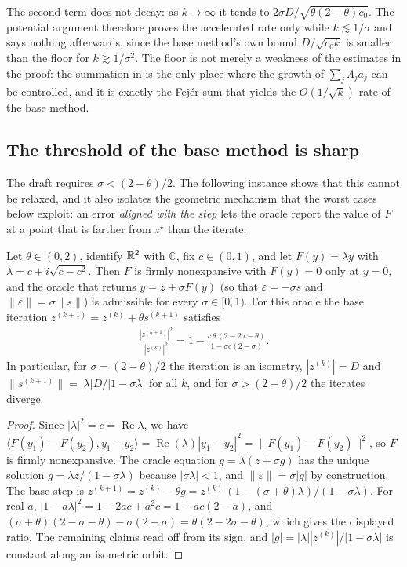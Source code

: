 The second term does not decay: as $k \to \infty$ it tends to $2\sigma D/\sqrt{\theta(2-\theta)c_0}$.
The potential argument therefore proves the accelerated rate only while $k \lesssim 1/\sigma$ and says nothing afterwards, since the base method's own bound $D/\sqrt{c_0 k}$ is smaller than the floor for $k \gtrsim 1/\sigma^2$.
The floor is not merely a weakness of the estimates in the proof: the summation in  is the only place where the growth of $\sum_j \Lambda_j a_j$ can be controlled, and it is exactly the Fej\'er sum that yields the $O(1/\sqrt{k})$ rate of the base method.

\subsection{The threshold of the base method is sharp}
The draft requires $\sigma < (2-\theta)/2$.
The following instance shows that this cannot be relaxed, and it also isolates the geometric mechanism that the worst cases below exploit: an error \emph{aligned with the step} lets the oracle report the value of $F$ at a point that is farther from $z^\star$ than the iterate.

\begin{proposition}\label{prop:acc-sharp}
    Let $\theta \in (0,2)$, identify $\mathbb{R}^2$ with $\mathbb{C}$, fix $c \in (0,1)$, and let $F(y) = \lambda y$ with $\lambda = c + i\sqrt{c - c^2}$.
    Then $F$ is firmly nonexpansive with $F(y) = 0$ only at $y = 0$, and the oracle that returns $y = z + \sigma F(y)$ (so that $\varepsilon = -\sigma s$ and $\|\varepsilon\| = \sigma\|s\|$) is admissible for every $\sigma \in [0,1)$.
    For this oracle the base iteration $z^{(k+1)} = z^{(k)} + \theta s^{(k+1)}$ satisfies
    \begin{align}
        \frac{|z^{(k+1)}|^2}{|z^{(k)}|^2} = 1 - \frac{c\,\theta\,(2 - 2\sigma - \theta)}{1 - \sigma c (2 - \sigma)} .
    \end{align}
    In particular, for $\sigma = (2-\theta)/2$ the iteration is an isometry, $|z^{(k)}| = D$ and $\|s^{(k+1)}\| = |\lambda| D/|1 - \sigma\lambda|$ for all $k$, and for $\sigma > (2-\theta)/2$ the iterates diverge.
\end{proposition}
\begin{proof}
    Since $|\lambda|^2 = c = \operatorname{Re}\lambda$, we have $\langle F(y_1) - F(y_2), y_1 - y_2\rangle = \operatorname{Re}(\lambda)|y_1 - y_2|^2 = \|F(y_1) - F(y_2)\|^2$, so $F$ is firmly nonexpansive.
    The oracle equation $g = \lambda(z + \sigma g)$ has the unique solution $g = \lambda z/(1 - \sigma\lambda)$ because $|\sigma\lambda| < 1$, and $\|\varepsilon\| = \sigma|g|$ by construction.
    The base step is $z^{(k+1)} = z^{(k)} - \theta g = z^{(k)}\,(1 - (\sigma + \theta)\lambda)/(1 - \sigma\lambda)$.
    For real $a$, $|1 - a\lambda|^2 = 1 - 2ac + a^2 c = 1 - ac(2-a)$, and $(\sigma+\theta)(2 - \sigma - \theta) - \sigma(2-\sigma) = \theta(2 - 2\sigma - \theta)$, which gives the displayed ratio.
    The remaining claims read off from its sign, and $|g| = |\lambda||z^{(k)}|/|1 - \sigma\lambda|$ is constant along an isometric orbit.
\end{proof}


